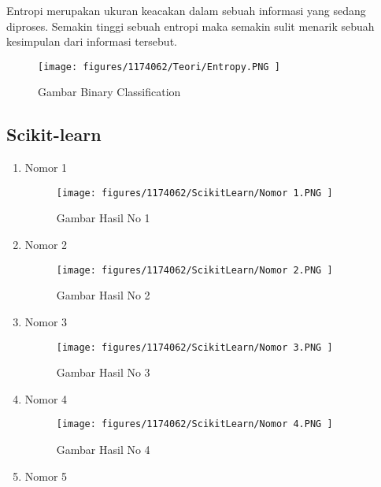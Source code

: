 \begin{enumerate}
Entropi merupakan ukuran keacakan dalam sebuah informasi yang sedang diproses. Semakin tinggi sebuah entropi  maka semakin sulit menarik sebuah kesimpulan dari informasi tersebut.

\begin{figure}[H]
	\texttt{[image: figures/1174062/Teori/Entropy.PNG ]}
	\centering
	\caption{Gambar Binary Classification }
\end{figure}

\subsection{Scikit-learn}
\begin{enumerate}
	\item Nomor 1
	\hfill\break
	
	
\begin{figure}[H]
	\texttt{[image: figures/1174062/ScikitLearn/Nomor 1.PNG ]}
	\centering
	\caption{Gambar Hasil No 1 }
\end{figure}
	
\item Nomor 2
	\hfill\break
	
	
\begin{figure}[H]
	\texttt{[image: figures/1174062/ScikitLearn/Nomor 2.PNG ]}
	\centering
	\caption{Gambar Hasil No 2 }
\end{figure}
	
\item Nomor 3
	\hfill\break
	
	
\begin{figure}[H]
	\texttt{[image: figures/1174062/ScikitLearn/Nomor 3.PNG ]}
	\centering
	\caption{Gambar Hasil No 3 }
\end{figure}

\item Nomor 4
	\hfill\break
	
	
\begin{figure}[H]
	\texttt{[image: figures/1174062/ScikitLearn/Nomor 4.PNG ]}
	\centering
	\caption{Gambar Hasil No 4 }
\end{figure}

\item Nomor 5
	\hfill\break
	
	

\end{enumerate}
\end{enumerate}
